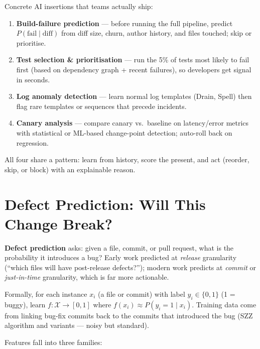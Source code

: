 Concrete AI insertions that teams actually ship:

\begin{enumerate}[leftmargin=1.2em, itemsep=0.3em]
  \item \textbf{Build-failure prediction} --- before running the full pipeline, predict $P(\text{fail}\mid\text{diff})$ from diff size, churn, author history, and files touched; skip or prioritise.
  \item \textbf{Test selection \& prioritisation} --- run the 5\% of tests most likely to fail first (based on dependency graph + recent failures), so developers get signal in seconds.
  \item \textbf{Log anomaly detection} --- learn normal log templates (Drain, Spell) then flag rare templates or sequences that precede incidents.
  \item \textbf{Canary analysis} --- compare canary vs.\ baseline on latency/error metrics with statistical or ML-based change-point detection; auto-roll back on regression.
\end{enumerate}

All four share a pattern: learn from history, score the present, and act (reorder, skip, or block) with an explainable reason.

\section{Defect Prediction: Will This Change Break?}\label{sec:defect-pred}
\textbf{Defect prediction} asks: given a file, commit, or pull request, what is the probability it introduces a bug? Early work predicted at \emph{release} granularity (``which files will have post-release defects?''); modern work predicts at \emph{commit} or \emph{just-in-time} granularity, which is far more actionable.

Formally, for each instance $x_i$ (a file or commit) with label $y_i\in\{0,1\}$ (1 = buggy), learn $f:\mathcal{X}\to[0,1]$ where $f(x_i)\approx P(y_i=1\mid x_i)$. Training data come from linking bug-fix commits back to the commits that introduced the bug (SZZ algorithm and variants --- noisy but standard).

Features fall into three families:

